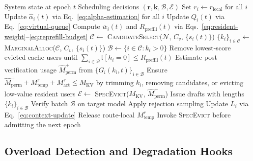 \documentclass[journal]{IEEEtran}
\newcommand{\ind}{\mathbb{I}}
\newcommand{\system}{SpecSched}
\begin{document}
\begin{algorithm}[t]
\caption{\system{}: Joint Scheduling per Epoch}
\label{alg:joint}
\begin{algorithmic}[1]
\REQUIRE System state at epoch $t$
\ENSURE Scheduling decisions 
        $(\mathbf{r}, \mathbf{k}, \mathcal{B}, \mathcal{E})$
\STATE Set $r_i \leftarrow r_{\mathrm{local}}$ for all $i$
\STATE Update $\hat{\alpha}_{i}(t)$ via 
       Eq.~\eqref{eq:alpha-estimation} for all $i$
\STATE Update $Q_i(t)$ via Eq.~\eqref{eq:virtual-queue}
\STATE Compute $\bar{w}_i(t)$ and $R_{\text{prefill}}(t)$ via
       Eqs.~\eqref{eq:resident-weight}--\eqref{eq:reprefill-budget}
\STATE $\mathcal{C} \leftarrow$ 
       \textsc{CandidateSelect}($\mathcal{N}$, $C_v$, 
       $\{s_i(t)\}$) 
\STATE $\{k_i\}_{i \in \mathcal{C}} \leftarrow$ 
       \textsc{MarginalAlloc}($\mathcal{C}$, $C_v$, 
       $\{s_i(t)\}$) 
\STATE $\mathcal{B} \leftarrow \{i \in \mathcal{C}: k_i > 0\}$
\STATE Remove lowest-score evicted-cache users until
       $\sum_{i\in\mathcal{B}}\ind[h_i=0]\leq R_{\text{prefill}}(t)$
\STATE Estimate post-verification usage 
       $\widehat{M}_{\text{perm}}^{+}$ from 
       $\{G_i(k_i,t)\}_{i\in\mathcal{B}}$
\STATE Ensure 
       $\widehat{M}_{\text{perm}}^{+}+M_{\text{temp}}^r+M_{\text{act}}^r
       \leq M_{\text{KV}}$ by trimming $k_i$, removing candidates, 
       or evicting low-value resident users
    \STATE $\mathcal{E} \leftarrow$ 
           \textsc{SpecEvict}($M_{\text{KV}}$, $\widehat{M}_{\text{perm}}^{+}$) 
\ENDIF
\STATE Issue drafts with lengths $\{k_i\}_{i \in \mathcal{B}}$
\STATE Verify batch $\mathcal{B}$ on target model
\STATE Apply rejection sampling
\STATE Update $L_i$ via Eq.~\eqref{eq:context-update}
\STATE Release route-local $M_{\text{temp}}^r$
    \STATE Invoke \textsc{SpecEvict} before admitting the next epoch
\ENDIF
\end{algorithmic}
\end{algorithm}

\subsection{Overload Detection and Degradation Hooks}
\label{sec:alg-guardrails}
\end{document}
